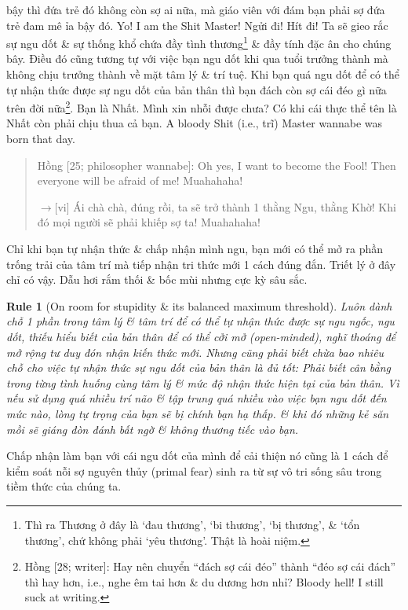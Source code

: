 \documentclass[12pt,oneside]{book}
\newtheorem{Rule}{Rule}
\begin{document}
bậy thì đứa trẻ đó không còn sợ ai nữa, mà giáo viên với đám bạn phải sợ đứa trẻ đam mê ỉa bậy đó. Yo! I am the Shit Master! Ngửi đi! Hít đi! Ta sẽ gieo rắc sự ngu dốt \& sự thống khổ chứa đầy tình thương\footnote{Thì ra Thương ở đây là `đau thương', `bi thương', `bị thương', \& `tổn thương', chứ không phải `yêu thương'. Thật là hoài niệm.} \& đầy tính đặc ân cho chúng bây. Điều đó cũng tương tự với việc bạn ngu dốt khi qua tuổi trưởng thành mà không chịu trưởng thành về mặt tâm lý \& trí tuệ. Khi bạn quá ngu dốt để có thể tự nhận thức được sự ngu dốt của bản thân thì bạn đách còn sợ cái đéo gì nữa trên đời nữa\footnote{{\sf Hồng [28; writer]}: Hay nên chuyển ``đách sợ cái đéo'' thành ``đéo sợ cái đách'' thì hay hơn, i.e., nghe êm tai hơn \& du dương hơn nhỉ? Bloody hell! I still suck at writing.}. Bạn là Nhất. Mình xin nhỗi được chưa? Có khi cái thực thể tên là Nhất còn phải chịu thua cả bạn. A bloody Shit (i.e., trĩ) Master wannabe was born that day.

\begin{quote}
	{\sf Hồng [25; philosopher wannabe]}: Oh yes, I want to become the Fool! Then everyone will be afraid of me! Muahahaha!
	
	{\sf[en]$\to$[vi]} Ái chà chà, đúng rồi, ta sẽ trở thành 1 thằng Ngu, thằng Khờ! Khi đó mọi người sẽ phải khiếp sợ ta! Muahahaha!
\end{quote}
Chỉ khi bạn tự nhận thức \& chấp nhận mình ngu, bạn mới có thể mở ra phần trống trải của tâm trí mà tiếp nhận tri thức mới 1 cách đúng đắn. Triết lý ở đây chỉ có vậy. Dẫu hơi rắm thối \& bốc mùi nhưng cực kỳ sâu sắc.

\begin{Rule}[On room for stupidity \& its balanced maximum threshold]
	Luôn dành chỗ 1 phần trong tâm lý \& tâm trí để có thể tự nhận thức được sự ngu ngốc, ngu dốt, thiếu hiểu biết của bản thân để có thể cởi mở (open-minded), nghĩ thoáng để mở rộng tư duy đón nhận kiến thức mới. Nhưng cũng phải biết chừa bao nhiêu chỗ cho việc tự nhận thức sự ngu dốt của bản thân là đủ tốt: Phải biết cân bằng trong từng tình huống cùng tâm lý \& mức độ nhận thức hiện tại của bản thân. Vì nếu sử dụng quá nhiều trí não \& tập trung quá nhiều vào việc bạn ngu dốt đến mức nào, lòng tự trọng của bạn sẽ bị chính bạn hạ thấp. \& khi đó những kẻ săn mồi sẽ giáng đòn đánh bất ngờ \& không thương tiếc vào bạn.
\end{Rule}
Chấp nhận làm bạn với cái ngu dốt của mình để cải thiện nó cũng là 1 cách để kiểm soát nỗi sợ nguyên thủy (primal fear) sinh ra từ sự vô tri sống sâu trong tiềm thức của chúng ta.
\end{document}
